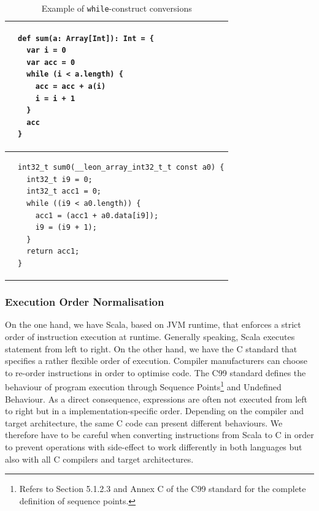 \documentclass{article}
\newcommand{\inlinecode}[1]{\lstinline[basicstyle=\ttfamily]|#1|}
\newcommand{\vheading}[1]{\rotatebox[origin=c]{90}{~\textbf{#1}~}}
\begin{document}
\begin{table}[h]
  \centering
  \begin{tabular}{@{} c || l}
    \toprule

    \vheading{Scala} &
    \begin{lstlisting}[language=MyScala]
def sum(a: Array[Int]): Int = {
  var i = 0
  var acc = 0
  while (i < a.length) {
    acc = acc + a(i)
    i = i + 1
  }
  acc
}
    \end{lstlisting} \\

    \midrule

    \vheading{C99} &
    \begin{lstlisting}[language=C99]
int32_t sum0(__leon_array_int32_t_t const a0) {
  int32_t i9 = 0;
  int32_t acc1 = 0;
  while ((i9 < a0.length)) {
    acc1 = (acc1 + a0.data[i9]);
    i9 = (i9 + 1);
  }
  return acc1;
}
    \end{lstlisting} \\

    \bottomrule
  \end{tabular}
  \caption{Example of \inlinecode{while}-construct conversions}
  \label{tab:example-simple-while}
\end{table}



\subsubsection{Execution Order Normalisation}
\label{sec:normalisation}


On the one hand, we have Scala, based on JVM runtime, that enforces a strict
order of instruction execution at runtime. Generally speaking, Scala executes
statement from left to right. On the other hand, we have the C standard that
specifies a rather flexible order of execution. Compiler manufacturers can
choose to re-order instructions in order to optimise code. The C99 standard
defines the behaviour of program execution through Sequence
Points\footnote{Refers to Section 5.1.2.3 and Annex C of the C99 standard for
the complete definition of sequence points.} and Undefined Behaviour. As a
direct consequence, expressions are often not executed from left to right but in
a implementation-specific order. Depending on the compiler and target
architecture, the same C code can present different behaviours. We therefore
have to be careful when converting instructions from Scala to C in order to
prevent operations with side-effect to work differently in both languages but
also with all C compilers and target architectures.
\end{document}
